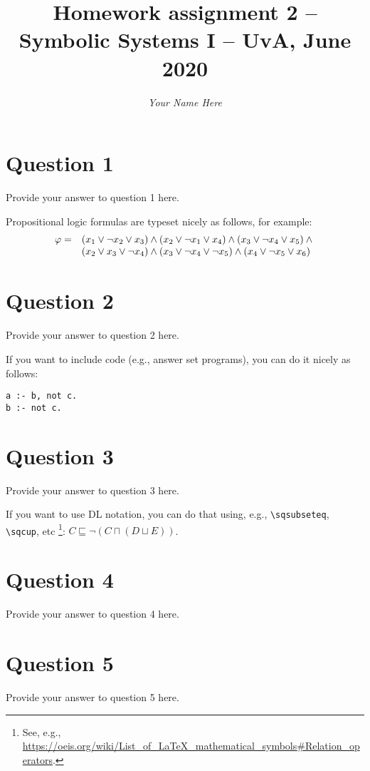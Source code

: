 \documentclass[10pt,a4paper]{article}
\title{Homework assignment 2 -- Symbolic Systems I -- UvA, June 2020}
\author{\it Your Name Here}
\date{}
\begin{document}
\maketitle

\section*{Question 1}

Provide your answer to question 1 here.

Propositional logic formulas are typeset nicely as follows, for example:
\[ \begin{array}{r l}
  \varphi = &
    (x_1 \vee \neg x_2 \vee x_3)
    \wedge
    (x_2 \vee \neg x_1 \vee x_4)
    \wedge
    (x_3 \vee \neg x_4 \vee x_5)
    \wedge {} \\
  & (x_2 \vee x_3 \vee \neg x_4)
    \wedge
    (x_3 \vee \neg x_4 \vee \neg x_5)
    \wedge
    (x_4 \vee \neg x_5 \vee x_6) \\
\end{array} \]

\section*{Question 2}

Provide your answer to question 2 here.

If you want to include code (e.g., answer set programs), you can do it nicely as follows:

\begin{lstlisting}
a :- b, not c.
b :- not c.
\end{lstlisting}

\section*{Question 3}

Provide your answer to question 3 here.

If you want to use DL notation,
you can do that using, e.g., \verb|\sqsubseteq|, \verb|\sqcup|, etc%
\footnote{See, e.g., \url{https://oeis.org/wiki/List_of_LaTeX_mathematical_symbols\#Relation_operators}.}:
$C \sqsubseteq \neg (C \sqcap (D \sqcup E))$.

\section*{Question 4}

Provide your answer to question 4 here.

\section*{Question 5}

Provide your answer to question 5 here.
\end{document}
